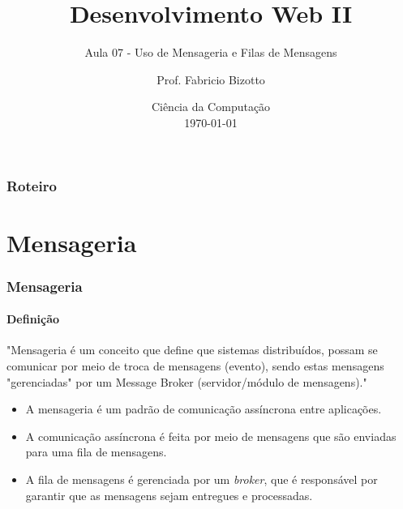\documentclass[
	9pt, %
	t, %
]{beamer}
\title[DesWebII]{Desenvolvimento Web II} %
\subtitle{Aula 07 - Uso de Mensageria e Filas de Mensagens} %
\author[Fabricio Bizotto]{Prof. Fabricio Bizotto} %
\institute[IFC]{Instituto Federal Catarinense \\ \smallskip \textit{fabricio.bizotto@ifc.edu.br}} %
\date[\today]{Ciência da Computação \\ \today} %
\newcommand{\yellowbox}[1]{\colorbox{yellow!75}{#1}}
\begin{document}

\begin{frame}
	\titlepage %
\end{frame}


\begin{frame}
	\frametitle{Roteiro} %
	
	\tableofcontents %
\end{frame}


\section{Mensageria}


\begin{frame}
	\frametitle{Mensageria}
	\framesubtitle{Definição}

	"Mensageria é um conceito que define que sistemas distribuídos, possam se comunicar por meio de troca de mensagens (evento), sendo estas mensagens "gerenciadas" por um Message Broker (servidor/módulo de mensagens)."

	\begin{itemize}
		\item A mensageria é um padrão de comunicação \yellowbox{assíncrona} entre aplicações.
		\item A comunicação assíncrona é feita por meio de mensagens que são enviadas para uma \yellowbox{fila de mensagens}.
		\item A fila de mensagens é gerenciada por um \textit{broker}, que é responsável por garantir que as mensagens sejam entregues e processadas.
	\end{itemize}

\end{frame}
\end{document}
